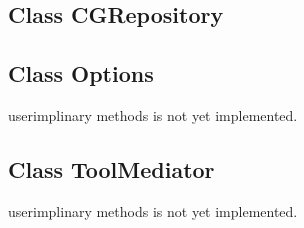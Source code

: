 \documentclass[11pt]{article}
\begin{document}
\subsection{Class CGRepository}
\label{sec:cguserimpl}


\subsection{Class Options}
\label{sec:optuserimpl}
userimplinary methods is not yet implemented.

\subsection{Class ToolMediator}
\label{sec:meduserimpl}
userimplinary methods is not yet implemented.

\newpage


%

\newpage
{}
\printindex

 
\end{document}
